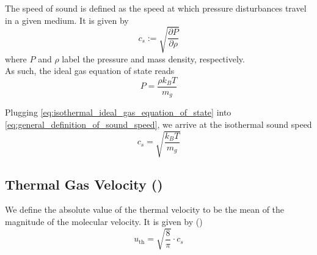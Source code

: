         The speed of sound is defined as the speed at which pressure disturbances travel in a 
        given medium. It is given by 
        \begin{equation}
            \label{eq:general_definition_of_sound_speed}
            c_s := \sqrt{\frac{\partial P}{\partial \rho}}
        \end{equation}
        where $P$ and $\rho$ label the pressure and mass density, respectively. \\
        
         As such, the ideal gas equation of state reads 
        \begin{equation}
            \label{eq:isothermal_ideal_gas_equation_of_state}
            P = \frac{\rho k_B T}{m_g}
        \end{equation}

        Plugging \cref{eq:isothermal_ideal_gas_equation_of_state} into
        \cref{eq:general_definition_of_sound_speed}, we arrive at the isothermal sound speed
        \begin{equation}
            c_s = \sqrt{\frac{k_BT}{m_g}}
        \end{equation}


        

    \clearpage\subsection{Thermal Gas Velocity ()}

        We define the absolute value of the thermal velocity to be the mean of the magnitude
        of the molecular velocity. It is given by ()
        \begin{equation}
            u_\text{th} = \sqrt{\frac{8}{\pi}} \cdot c_s
        \end{equation}

